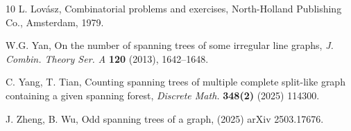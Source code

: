 \documentclass[10pt,a4paper]{article}
\newtheorem{false statement}{False statement}
\theoremstyle{definition}
\begin{document}
\begin{thebibliography}{10}
L. Lov\'{a}sz,
Combinatorial problems and exercises,
North-Holland Publishing Co., Amsterdam, 1979.

W.G. Yan,
On the number of spanning trees of some irregular line graphs,
\emph{J. Combin. Theory Ser. A} {\bf 120} (2013), 1642--1648.

C. Yang, T. Tian,  
Counting spanning trees of multiple complete split-like graph containing a given spanning forest, 
\emph{Discrete Math.} {\bf 348(2)} (2025) 114300.


J. Zheng, B. Wu,  
Odd spanning trees of a graph, (2025) arXiv 2503.17676.









\end{thebibliography}
\end{document}
